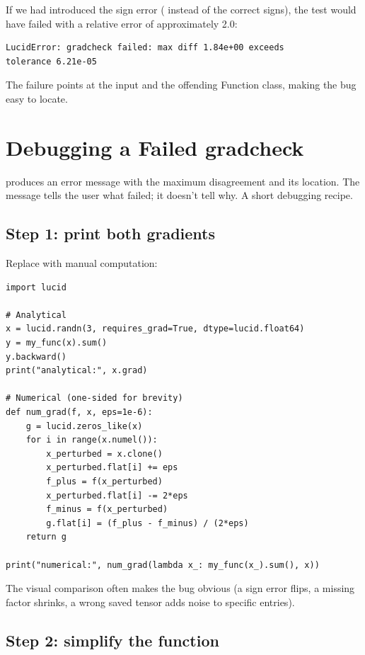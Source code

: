 If we had introduced the sign error ( instead of the correct signs), the test would have
failed with a relative error of approximately 2.0:

\begin{verbatim}
LucidError: gradcheck failed: max diff 1.84e+00 exceeds
tolerance 6.21e-05
\end{verbatim}

The failure points at the input and the offending Function class,
making the bug easy to locate.

\section{Debugging a Failed gradcheck}
\label{sec:gradcheck:debugging_failure}

 produces an error message with the maximum
disagreement and its location. The message tells the user what
failed; it doesn't tell why. A short debugging recipe.

\subsection{Step 1: print both gradients}
\label{ssec:gradcheck:debug_print}

Replace  with manual computation:

\begin{lstlisting}[style=lucid,language=LucidPython]
import lucid

# Analytical
x = lucid.randn(3, requires_grad=True, dtype=lucid.float64)
y = my_func(x).sum()
y.backward()
print("analytical:", x.grad)

# Numerical (one-sided for brevity)
def num_grad(f, x, eps=1e-6):
    g = lucid.zeros_like(x)
    for i in range(x.numel()):
        x_perturbed = x.clone()
        x_perturbed.flat[i] += eps
        f_plus = f(x_perturbed)
        x_perturbed.flat[i] -= 2*eps
        f_minus = f(x_perturbed)
        g.flat[i] = (f_plus - f_minus) / (2*eps)
    return g

print("numerical:", num_grad(lambda x_: my_func(x_).sum(), x))
\end{lstlisting}

The visual comparison often makes the bug obvious (a sign error
flips, a missing factor shrinks, a wrong saved tensor adds noise
to specific entries).

\subsection{Step 2: simplify the function}
\label{ssec:gradcheck:debug_simplify}

